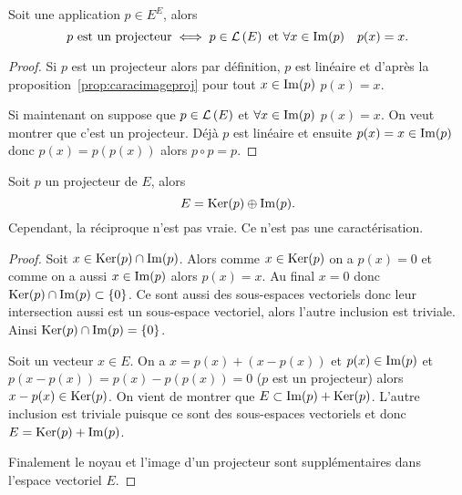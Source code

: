 \begin{prop}
  Soit une application \(p \in E^E\), alors
  \begin{equation}
    p \text{~est un projecteur} \iff p \in \mathcal{L}\left(E\right) \text{~et~} \forall x \in 
    \operatorname{Im}(p) \quad p(x)=x.
  \end{equation}
\end{prop}
\begin{proof}
  Si \(p\) est un projecteur alors par définition, \(p\) est linéaire et d'après 
  la proposition~\ref{prop:caracimageproj} pour tout \(x \in \operatorname{Im}(p)\) \(p(x)=x\).

  Si maintenant on suppose que \(p \in \mathcal{L}\left(E\right)\) et \(\forall x \in \operatorname{Im}(p)\) 
  \(p(x)=x\). On veut montrer que c'est un projecteur. Déjà \(p\) est linéaire 
  et ensuite \(p(x)=x \in \operatorname{Im}(p)\) donc \(p(x)=p(p(x))\) alors \(p \circ 
  p=p\).
\end{proof}

\begin{prop}\label{prop:projecteursupplementaire}
  Soit \(p\) un projecteur de \(E\), alors
  \begin{equation}
    E = \operatorname{Ker}(p) \oplus \operatorname{Im}(p).
  \end{equation}
  Cependant, la réciproque n'est pas vraie. Ce n'est pas une caractérisation.
\end{prop}
\begin{proof}
  Soit \(x \in \operatorname{Ker}(p) \cap \operatorname{Im}(p)\). Alors comme \(x \in \operatorname{Ker}(p)\) on a 
  \(p(x)=0\) et comme on a aussi \(x \in \operatorname{Im}(p)\) alors \(p(x)=x\). Au final 
  \(x = 0\) donc \(\operatorname{Ker}(p) \cap \operatorname{Im}(p) \subset \{0\}\). Ce sont aussi des 
  sous-espaces vectoriels donc leur intersection aussi est un sous-espace 
  vectoriel, alors l'autre inclusion est triviale. Ainsi \(\operatorname{Ker}(p) \cap 
  \operatorname{Im}(p)=\{0\}\).

  Soit un vecteur \(x \in E\). On a \(x = p(x) +(x-p(x))\) et \(p(x) \in 
  \operatorname{Im}(p)\) et \(p(x-p(x))=p(x)-p(p(x))=0\) (\(p\) est un projecteur) alors 
  \(x-p(x) \in \operatorname{Ker}(p)\). On vient de montrer que \(E \subset \operatorname{Im}(p) + 
  \operatorname{Ker}(p)\). L'autre inclusion est triviale puisque ce sont des sous-espaces 
  vectoriels et donc \(E = \operatorname{Ker}(p) +\operatorname{Im}(p)\).

  Finalement le noyau et l'image d'un projecteur sont supplémentaires dans 
  l'espace vectoriel \(E\).
\end{proof}

